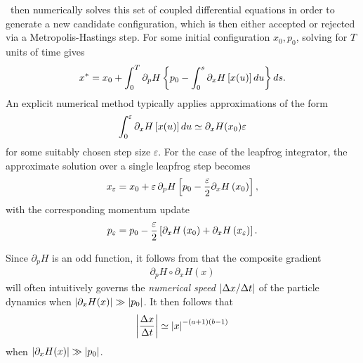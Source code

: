 \documentclass[a4paper]{article}
\begin{document}
\HMC\ then numerically solves this set of coupled differential equations in order to generate a new candidate configuration, which is then either accepted or rejected via a Metropolis-Hastings step. For some initial configuration $x_0, p_0$, solving  for $T$ units of time gives 
\begin{align}
x^* = x_0 + \int_0^T \partial_p H \left\{ p_0 - \int_0^s \partial_x H \left[ x(u) \right] du \right\} ds.
\end{align}
An explicit numerical method typically applies approximations of the form  
\begin{align}\label{eq:NumericalApprox}
\int_0^{\varepsilon} \partial_x H \left[ x(u) \right] du \simeq \partial_x H (x_0) \varepsilon
\end{align} 
for some suitably chosen step size $\varepsilon$. For the case of the leapfrog integrator, the approximate solution over a single leapfrog step becomes
\begin{align}\label{eq:NumericalXDynamics}
x_{\varepsilon} = x_0 + \varepsilon \, \partial_p H \left[ p_0 - \frac{\varepsilon}{2} \partial_x H \left( x_0 \right) \right] ,
\end{align}
with the corresponding momentum update 
\begin{align}
p_{\varepsilon} = p_0 - \frac{\varepsilon}{2} \left[ \partial_x H \left( x_0 \right) + \partial_x H \left( x_{\varepsilon} \right) \right] .
\end{align}

Since $\partial_p H$ is an odd function, it follows from  that the composite gradient
\begin{align}
\partial_p H \circ \partial_x H (x)
\end{align}
will often intuitively governs the \emph{numerical speed} $\left| \Delta x / \Delta t \right|$ of the particle dynamics when $\left| \partial_x H (x) \right| \gg \left| p_0 \right|$. It then follows that 
\begin{align}
\left| \frac{\Delta x}{\Delta t} \right| \simeq \left| x \right|^{-(a + 1)(b - 1)} 
\end{align}
when $\left| \partial_x H (x) \right| \gg \left| p_0 \right|$. 
\end{document}
